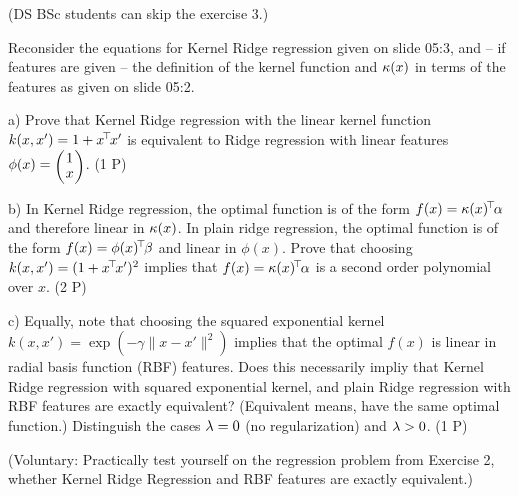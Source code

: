 

\renewcommand{\course}{Machine Learning}
\renewcommand{\exnum}{7}

\exercises
{}
\exercisestitle

(DS BSc students can skip the exercise 3.)



Reconsider the equations for Kernel Ridge regression given on slide
05:3, and -- if features are given -- the definition of the kernel
function and $\kappa(x)$ in terms of the features as given on slide 05:2.

a) Prove that Kernel Ridge regression with the linear kernel function
$k(x,x') = 1 + x^{\!\top\!} x'$ is equivalent to Ridge regression with linear
features $\phi(x) = \mat{c}{1 \\ x}$. (1 P)

b) In Kernel Ridge regression, the optimal function is of the form
$f(x) = \kappa(x)^{\!\top\!} \alpha$ and therefore linear in $\kappa(x)$. In plain ridge
regression, the optimal function is of the form $f(x) = \phi(x)^{\!\top\!} \beta$
and linear in $\phi(x)$. Prove that choosing $k(x,x') = (1+ x^{\!\top\!} x')^2$
implies that $f(x) = \kappa(x)^{\!\top\!} \alpha$ is a second order polynomial over
$x$.  (2 P)

c) Equally, note that choosing the squared exponential kernel $k(x,x')
= \exp(-\gamma \|x-x'\|^2)$ implies that the optimal $f(x)$ is linear
in radial basis function (RBF) features. Does this necessarily impliy
that Kernel Ridge regression with squared exponential kernel, and
plain Ridge regression with RBF features are exactly equivalent?
(Equivalent means, have the same optimal function.) Distinguish the
cases $\lambda=0$ (no regularization) and $\lambda>0$.  (1 P)

(Voluntary: Practically test yourself on the regression problem from Exercise 2, whether Kernel Ridge Regression and RBF features are exactly equivalent.)



